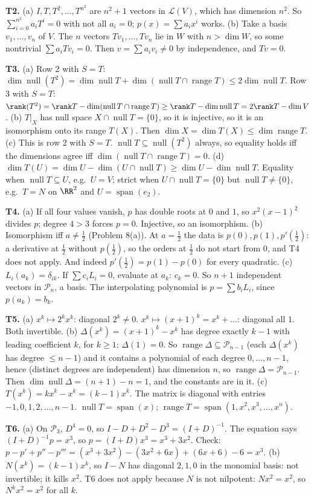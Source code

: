 \documentclass[11pt]{scrartcl}
\DeclareMathOperator{\nul}{null}
\DeclareMathOperator{\range}{range}
\DeclareMathOperator{\spn}{span}
\newcommand{\LL}{\mathcal L}
\newcommand{\PP}{\mathcal P}
\begin{document}
\textbf{T2.}
(a) $I,T,T^2,\dots,T^{n^2}$ are $n^2+1$ vectors in $\LL(V)$, which has dimension $n^2$. So $\sum_{i=0}^{n^2}a_iT^i=0$ with not all $a_i=0$; $p(x)=\sum a_ix^i$ works.
(b) Take a basis $v_1,\dots,v_n$ of $V$. The $n$ vectors $Tv_1,\dots,Tv_n$ lie in $W$ with $n>\dim W$, so some nontrivial $\sum a_iTv_i=0$. Then $v=\sum a_iv_i\ne0$ by independence, and $Tv=0$.

\textbf{T3.}
(a) Row 2 with $S=T$: $\dim\nul(T^2)=\dim\nul T+\dim(\nul T\cap\range T)\le2\dim\nul T$. Row 3 with $S=T$: $\rank(T^2)=\rank T-\dim(\nul T\cap\range T)\ge\rank T-\dim\nul T=2\rank T-\dim V$.
(b) $T|_X$ has null space $X\cap\nul T=\{0\}$, so it is injective, so it is an isomorphism onto its range $T(X)$. Then $\dim X=\dim T(X)\le\dim\range T$.
(c) This is row 2 with $S=T$. $\nul T\subseteq\nul(T^2)$ always, so equality holds iff the dimensions agree iff $\dim(\nul T\cap\range T)=0$.
(d) $\dim T(U)=\dim U-\dim(U\cap\nul T)\ge\dim U-\dim\nul T$. Equality when $\nul T\subseteq U$, e.g.\ $U=V$; strict when $U\cap\nul T=\{0\}$ but $\nul T\ne\{0\}$, e.g.\ $T=N$ on $\RR^2$ and $U=\spn(e_2)$.

\textbf{T4.}
(a) If all four values vanish, $p$ has double roots at $0$ and $1$, so $x^2(x-1)^2$ divides $p$; degree $4>3$ forces $p=0$. Injective, so an isomorphism.
(b) Isomorphism iff $a\ne\tfrac12$ (Problem 8(a)). At $a=\tfrac12$ the data is $p(0),p(1),p'(\tfrac12)$: a derivative at $\tfrac12$ without $p(\tfrac12)$, so the orders at $\tfrac12$ do not start from $0$, and T4 does not apply. And indeed $p'(\tfrac12)=p(1)-p(0)$ for every quadratic.
(c) $L_i(a_k)=\delta_{ik}$. If $\sum c_iL_i=0$, evaluate at $a_k$: $c_k=0$. So $n+1$ independent vectors in $\PP_n$, a basis. The interpolating polynomial is $p=\sum b_iL_i$, since $p(a_k)=b_k$.

\textbf{T5.}
(a) $x^k\mapsto2^kx^k$: diagonal $2^k\ne0$. $x^k\mapsto(x+1)^k=x^k+\dots$: diagonal all $1$. Both invertible.
(b) $\Delta(x^k)=(x+1)^k-x^k$ has degree exactly $k-1$ with leading coefficient $k$, for $k\ge1$; $\Delta(1)=0$. So $\range\Delta\subseteq\PP_{n-1}$ (each $\Delta(x^k)$ has degree $\le n-1$) and it contains a polynomial of each degree $0,\dots,n-1$, hence (distinct degrees are independent) has dimension $n$, so $\range\Delta=\PP_{n-1}$. Then $\dim\nul\Delta=(n+1)-n=1$, and the constants are in it.
(c) $T(x^k)=kx^k-x^k=(k-1)x^k$. The matrix is diagonal with entries $-1,0,1,2,\dots,n-1$. $\nul T=\spn(x)$; $\range T=\spn(1,x^2,x^3,\dots,x^n)$.

\textbf{T6.}
(a) On $\PP_3$, $D^4=0$, so $I-D+D^2-D^3=(I+D)^{-1}$. The equation says $(I+D)^{-1}p=x^3$, so $p=(I+D)x^3=x^3+3x^2$. Check: $p-p'+p''-p'''=(x^3+3x^2)-(3x^2+6x)+(6x+6)-6=x^3$.
(b) $N(x^k)=(k-1)x^k$, so $I-N$ has diagonal $2,1,0$ in the monomial basis: not invertible; it kills $x^2$. T6 does not apply because $N$ is not nilpotent: $Nx^2=x^2$, so $N^kx^2=x^2$ for all $k$.
\end{document}
